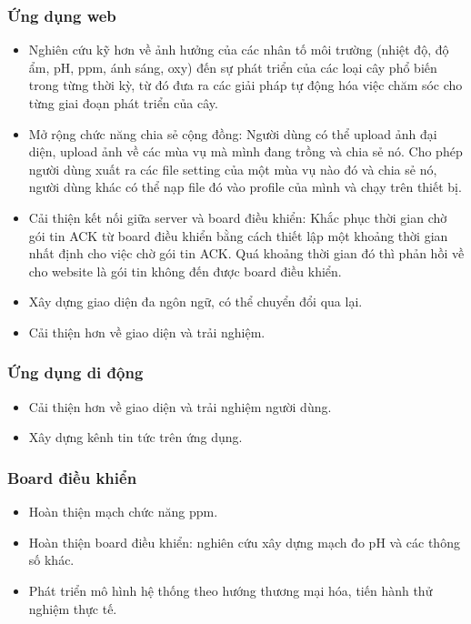 \documentclass[a4paper,12pt,oneside]{article}
\begin{document}
\subsubsection{Ứng dụng web}
\begin{itemize}
\item Nghiên cứu kỹ hơn về ảnh hưởng của các nhân tố môi trường (nhiệt độ, độ ẩm, pH, ppm, ánh sáng, oxy) đến sự phát triển của các loại cây phổ biến trong từng thời kỳ, từ đó đưa ra các giải pháp tự động hóa việc chăm sóc cho từng giai đoạn phát triển của cây.
\item Mở rộng chức năng chia sẻ cộng đồng: Người dùng có thể upload ảnh đại diện, upload ảnh về các mùa vụ mà mình đang trồng và chia sẻ nó. Cho phép người dùng xuất ra các file setting của một mùa vụ nào đó và chia sẻ nó, người dùng khác có thể nạp file đó vào profile của mình và chạy trên thiết bị.
\item Cải thiện kết nối giữa server và board điều khiển: Khắc phục thời gian chờ gói tin ACK từ board điều khiển bằng cách thiết lập một khoảng thời gian nhất định cho việc chờ gói tin ACK. Quá khoảng thời gian đó thì phản hồi về cho website là gói tin không đến được board điều khiển.
\item Xây dựng giao diện đa ngôn ngữ, có thể chuyển đổi qua lại.
\item Cải thiện hơn về giao diện và trải nghiệm.
\end{itemize}

\subsubsection{Ứng dụng di động}
\begin{itemize}
\item Cải thiện hơn về giao diện và trải nghiệm người dùng.
\item Xây dựng kênh tin tức trên ứng dụng.
\end{itemize}

\subsubsection{Board điều khiển}
\begin{itemize}
\item Hoàn thiện mạch chức năng ppm.
\item Hoàn thiện board điều khiển: nghiên cứu xây dựng mạch đo pH và các thông số khác.
\item Phát triển mô hình hệ thống theo hướng thương mại hóa, tiến hành thử nghiệm thực tế.
\end{itemize}
\end{document}
